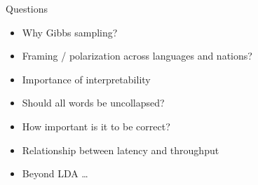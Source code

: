 \documentclass[compress]{beamer}
\begin{document}
\begin{frame}{Questions}

  \begin{itemize}
    \item Why Gibbs sampling?
      \pause
    \item Framing / polarization across languages and nations?
      \pause
    \item Importance of interpretability
      \pause
    \item Should all words be uncollapsed?
      \pause
    \item How important is it to be correct?
      \pause
    \item Relationship between latency and throughput
      \pause
    \item Beyond LDA \dots
  \end{itemize}

\end{frame}

\begin{frame}

\tiny

\end{frame}
\end{document}

